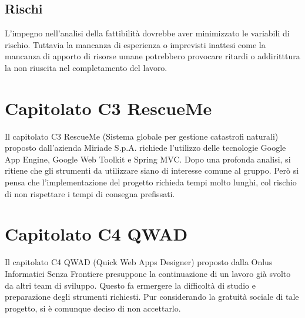 \section{Rischi}
L'impegno nell'analisi della fattibilit\`a dovrebbe aver minimizzato le variabili di rischio.
Tuttavia la mancanza di esperienza o imprevisti inattesi come la mancanza di apporto di risorse umane potrebbero provocare ritardi o addiritttura la non riuscita nel completamento del lavoro.

\chapter{Capitolato C3 RescueMe}
Il capitolato C3 RescueMe (Sistema globale per gestione catastrofi naturali)
proposto dall'azienda Miriade S.p.A. richiede l'utilizzo delle tecnologie
Google App Engine, Google Web Toolkit e Spring MVC. Dopo una profonda analisi,
si ritiene che gli strumenti da utilizzare siano di interesse comune al gruppo.
Per\`o si pensa che l'implementazione del progetto richieda tempi molto lunghi, col rischio di non rispettare i tempi di consegna prefissati.

\chapter{Capitolato C4 QWAD}
Il capitolato C4 QWAD (Quick Web Apps Designer) proposto dalla Onlus Informatici
Senza Frontiere presuppone la continuazione di un lavoro gi\`a svolto da altri
team di sviluppo. Questo fa ermergere la difficolt\`a di studio e preparazione degli strumenti richiesti. Pur considerando la gratuit\`a sociale di tale progetto, si \`e comunque deciso di non accettarlo.

